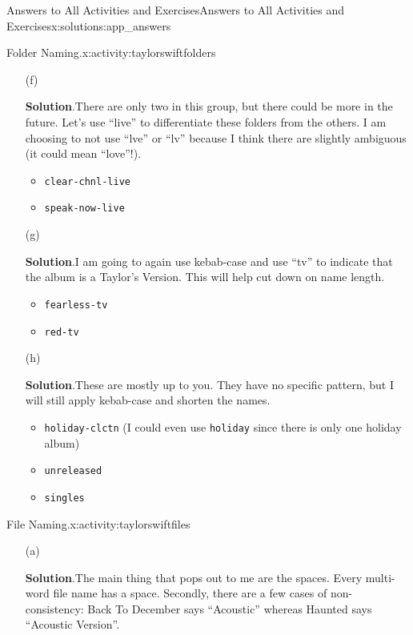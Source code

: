 \documentclass[oneside,10pt,]{book}
\newcommand{\blocktitlefont}{\relax}
\newcommand{\mono}[1]{\texttt{#1}}
\begin{document}
\begin{solutions-chapter}{Answers to All Activities and Exercises}{}{Answers to All Activities and Exercises}{}{}{x:solutions:app_answers}
\begin{activitysolution}{1.1}{Folder Naming.}{x:activity:taylorswiftfolders}
\begin{enumerate}[font=\bfseries,label=(\alph*),ref=\alph*]
\begin{multicols}{2}
\end{multicols}
%
\item[(f)]\par\smallskip%
\noindent\textbf{\blocktitlefont Solution}.\hypertarget{g:solution:idm480986824-back}{}\quad{}There are only two in this group, but there could be more in the future. Let's use ``live'' to differentiate these folders from the others. I am choosing to not use ``lve'' or ``lv'' because I think there are slightly ambiguous (it could mean ``love''!).%
\begin{itemize}[label=\textbullet]
\item{}\mono{clear-chnl-live}%
\item{}\mono{speak-now-live}%
\end{itemize}
%
\item[(g)]\par\smallskip%
\noindent\textbf{\blocktitlefont Solution}.\hypertarget{g:solution:idm480975304-back}{}\quad{}I am going to again use kebab-case and use ``tv'' to indicate that the album is a Taylor's Version. This will help cut down on name length.%
\begin{itemize}[label=\textbullet]
\item{}\mono{fearless-tv}%
\item{}\mono{red-tv}%
\end{itemize}
%
\item[(h)]\par\smallskip%
\noindent\textbf{\blocktitlefont Solution}.\hypertarget{g:solution:idm480978376-back}{}\quad{}These are mostly up to you. They have no specific pattern, but I will still apply kebab-case and shorten the names.%
\begin{itemize}[label=\textbullet]
\item{}\mono{holiday-clctn} (I could even use \mono{holiday} since there is only one holiday album)%
\item{}\mono{unreleased}%
\item{}\mono{singles}%
\end{itemize}
%
\end{enumerate}
\end{activitysolution}%
\begin{activitysolution}{1.2}{File Naming.}{x:activity:taylorswiftfiles}%
\begin{enumerate}[font=\bfseries,label=(\alph*),ref=\alph*]
\item[(a)]\par\smallskip%
\noindent\textbf{\blocktitlefont Solution}.\hypertarget{g:solution:idm480949576-back}{}\quad{}The main thing that pops out to me are the spaces. Every multi-word file name has a space. Secondly, there are a few cases of non-consistency: Back To December says ``Acoustic'' whereas Haunted says ``Acoustic Version''.%

\end{enumerate}
\end{activitysolution}
\end{solutions-chapter}
\end{document}
